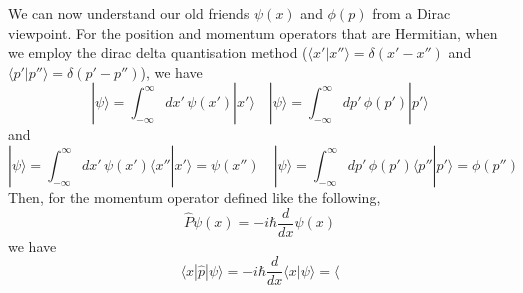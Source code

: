 \vspace{2ex}
\begin{rmk}
We can now understand our old friends $\psi (x)$ and $\phi (p)$ from a Dirac viewpoint. For the position and momentum operators that are Hermitian, when we employ the dirac delta quantisation method ($\langle x'|x''\rangle =\delta (x'-x'')$ and $\langle p'|p''\rangle =\delta (p'-p'')$), we have
\[|\psi \rangle =\int_{-\infty }^{\infty } dx'\,\psi (x')|x'\rangle \quad |\psi \rangle =\int_{-\infty }^{\infty } dp'\,\phi (p')|p'\rangle \]
and
\[|\psi \rangle =\int_{-\infty }^{\infty } dx'\,\psi (x')\langle x''|x'\rangle=\psi (x'') \quad |\psi \rangle =\int_{-\infty }^{\infty } dp'\,\phi (p')\langle p''|p'\rangle =\phi (p'')\]
Then, for the momentum operator defined like the following,
\[\hat{P}\psi (x)=-i\hbar \dfrac{d }{d x}\psi (x) \]
we have
\[\langle x|\hat{p}|\psi \rangle =-i\hbar \dfrac{d }{d x}\langle x|\psi \rangle=\langle  \]
\end{rmk}
\vspace{2ex}

